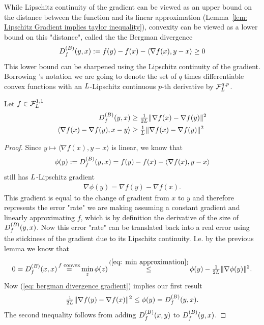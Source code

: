 While Lipschitz continuity of the gradient can be viewed as an upper
bound on the distance between the function and its linear approximation
(Lemma~\ref{lem: Lipschitz Gradient implies taylor inequality}),
convexity can be viewed as a lower bound on this "distance", called the 
the Bergman divergence
%
\begin{align*}
	\bergmanDiv{f}(y,x):= f(y)-f(x)-\langle \nabla f(x), y-x\rangle \ge 0
\end{align*}
%
This lower bound can be sharpened using the Lipschitz continuity of
the gradient.
Borrowing \citeauthor{nesterovLecturesConvexOptimization2018}'s notation
we are going to denote  the set of \(q\) times differentiable convex functions
with an \(\ubound\)-Lipschitz continuous \(p\)-th derivative by
\(\lipGradientSet[q,p]{\ubound}\).
%
\begin{lemma}\label{lem: bermanDiv lower bound}
	Let \(f\in\lipGradientSet{\ubound}\)
	\begin{subequations}
	\begin{align}
		\bergmanDiv{f}(y,x)
		&\ge \tfrac{1}{2\ubound}\|\nabla f(x) - \nabla f(y)\|^2\\
		\label{eq: bergmanDiv lower bound b}
		\langle \nabla f(x) - \nabla f(y), x-y\rangle
		&\ge \tfrac{1}{\ubound}\|\nabla f(x) - \nabla f(y)\|^2
	\end{align}	
	\end{subequations}	
\end{lemma}
\begin{proof}
	Since \(y\mapsto \langle\nabla f(x), y-x\rangle\) is linear, we know that
	\begin{align*}
		\phi(y):=\bergmanDiv{f}(y,x) = f(y)-f(x)-\langle \nabla f(x), y-x\rangle 
	\end{align*}
	still has \(\ubound\)-Lipschitz gradient
	\begin{align}\label{eq: bergman divergence gradient}
		\nabla\phi(y) = \nabla f(y) - \nabla f(x).
	\end{align}
	This gradient is equal to the change of gradient from \(x\) to \(y\) and 
	therefore represents the error "rate" we are making assuming a constant gradient
	and linearly approximating \(f\), which is by definition the derivative of the size of
	\(\bergmanDiv{f}(y,x)\). Now this error "rate" can be translated
 	back into a real error using the stickiness of the gradient due to
	its Lipschitz continuity. I.e. by the previous lemma we know that
	\begin{align*}
		0 = \bergmanDiv{f}(x,x)
		\xeq{f\text{ convex}} \min_z\phi(z)
		\xle{(\ref{eq: min approximation})} \phi(y) - \tfrac{1}{2\ubound}\|\nabla \phi(y)\|^2.
	\end{align*}
	Now (\ref{eq: bergman divergence gradient}) implies our first result
	\begin{align*}
		\tfrac{1}{2\ubound}\|\nabla f(y) - \nabla f(x)\|^2
		\le \phi(y) =\bergmanDiv{f}(y,x).
	\end{align*}
	The second inequality follows from adding \(\bergmanDiv{f}(x,y)\) to
	\(\bergmanDiv{f}(y,x)\).
\end{proof}

